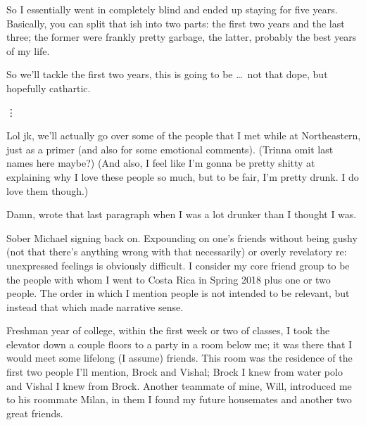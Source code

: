 \documentclass[./butidigress.tex]{subfiles}
\begin{document}
So I essentially went in completely blind and ended up staying for five years.
Basically, you can split that ish into two parts: the first two years and the last three; the former were frankly pretty garbage, the latter, probably the best years of my life.

So we'll tackle the first two years, this is going to be \ldots\ not that dope, but hopefully cathartic.

\vdots

Lol jk, we'll actually go over some of the people that I met while at Northeastern, just as a primer (and also for some emotional comments).
(Trinna omit last names here maybe?)
(And also, I feel like I'm gonna be pretty shitty at explaining why I love these people so much, but to be fair, I'm pretty drunk.
I do love them though.)

Damn, wrote that last paragraph when I was a lot drunker than I thought I was.

Sober Michael signing back on.
Expounding on one's friends without being gushy (not that there's anything wrong with that necessarily) or overly revelatory re: unexpressed feelings is obviously difficult.
I consider my core friend group to be the people with whom I went to Costa Rica in Spring 2018 plus one or two people.
The order in which I mention people is not intended to be relevant, but instead that which made narrative sense.

Freshman year of college, within the first week or two of classes, I took the elevator down a couple floors to a party in a room below me; it was there that I would meet some lifelong (I assume) friends.
This room was the residence of the first two people I'll mention, Brock and Vishal; Brock I knew from water polo and Vishal I knew from Brock.
Another teammate of mine, Will, introduced me to his roommate Milan, in them I found my future housemates and another two great friends.
\end{document}
